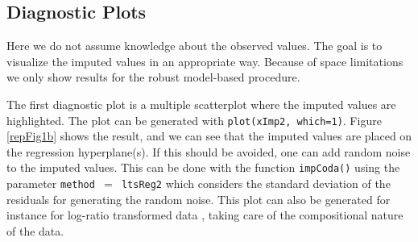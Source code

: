\documentclass{scrartcl}\usepackage[]{graphicx}\usepackage[]{color}
\begin{document}




\subsection{Diagnostic Plots}

Here we do not assume knowledge about the observed values. The goal is to visualize
the imputed values in an appropriate way. Because of space limitations we
only show results for the robust model-based procedure.

The first diagnostic plot is a multiple
scatterplot where the imputed values are highlighted. 
The plot can be generated with \texttt{plot(xImp2, which=1)}.
Figure \ref{repFig1b} shows the result, and we can see that the imputed values are 
placed on the regression hyperplane(s). If this should be avoided, one
can add random noise to the imputed values. This can be done with the function
{\tt impCoda()} using the parameter {\tt method $=$ ltsReg2} which considers
the standard deviation of the residuals for generating the random noise. 
This plot can also be generated for instance for log-ratio transformed data
\citep{Aitchison86}, taking care of the compositional nature of the data.


\end{document}
